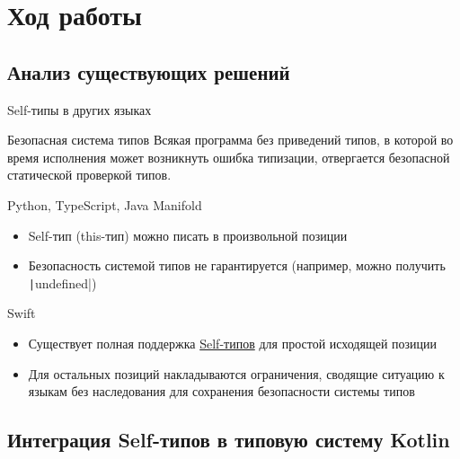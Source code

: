 \documentclass[aspectratio=169,usenames,dvipsnames]{beamer}
\begin{document}
    \section{Ход работы}

    \subsection{Анализ существующих решений}

    \begin{frame}[fragile]{Self-типы в других языках}
        \begin{block}{Безопасная система типов}
            Всякая программа без приведений типов, в которой во время исполнения может возникнуть ошибка типизации, отвергается безопасной статической проверкой типов.
        \end{block}
        \pause
        \begin{block}{Python, TypeScript, Java Manifold}
            \begin{itemize}
                \item Self-тип (this-тип) можно писать в произвольной позиции
                \item Безопасность системой типов не гарантируется (например, можно получить \texttt|undefined|)
            \end{itemize}
        \end{block}
        \pause
        \begin{block}{Swift}
            \begin{itemize}
                \item Существует полная поддержка \href{https://docs.swift.org/swift-book/documentation/the-swift-programming-language/types/\#Self-Type}{Self-типов} для простой исходящей позиции
                \item Для остальных позиций накладываются ограничения, сводящие ситуацию к языкам без наследования для сохранения безопасности системы типов
            \end{itemize}
        \end{block}
    \end{frame}

    \subsection{Интеграция Self-типов в типовую систему Kotlin}
\end{document}
